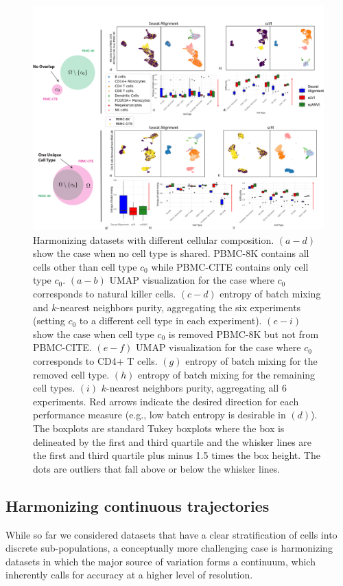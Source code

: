 \begin{figure}[htp]
\centering
\includegraphics[width=\textwidth]{figures/Fig3.jpg}
\caption[Harmonizing datasets with different cellular composition]{Harmonizing datasets with different cellular composition. $(a-d)$ show the case when no cell type is shared. PBMC-8K contains all cells other than cell type $c_0$ while PBMC-CITE contains only cell type $c_0$. $(a-b)$ UMAP visualization for the case where $c_0$ corresponds to natural killer cells. $(c-d)$ entropy of batch mixing and $k$-nearest neighbors purity, aggregating the six experiments (setting $c_0$ to a different cell type in each experiment). $(e-i)$ show the case when cell type $c_0$ is removed PBMC-8K but not from PBMC-CITE. $(e-f)$ UMAP visualization for the case where $c_0$ corresponds to CD4+ T cells. $(g)$ entropy of batch mixing for the removed cell type. $(h)$ entropy of batch mixing for the remaining cell types. $(i)$ $k$-nearest neighbors purity, aggregating all 6 experiments. Red arrows indicate the desired direction for each performance measure (e.g., low batch entropy is desirable in $(d)$). The boxplots are standard Tukey boxplots where the box is delineated by the first and third quartile and the whisker lines are the first and third quartile plus minus 1.5 times the box height. The dots are outliers that fall above or below the whisker lines.}
\label{scanvirobustness_panel}
\end{figure}


\subsection{Harmonizing continuous trajectories}
While so far we considered datasets that have a clear stratification of cells into discrete sub-populations, a conceptually more challenging case is harmonizing datasets in which the major source of variation forms a continuum, which inherently calls for accuracy at a higher level of resolution. 


